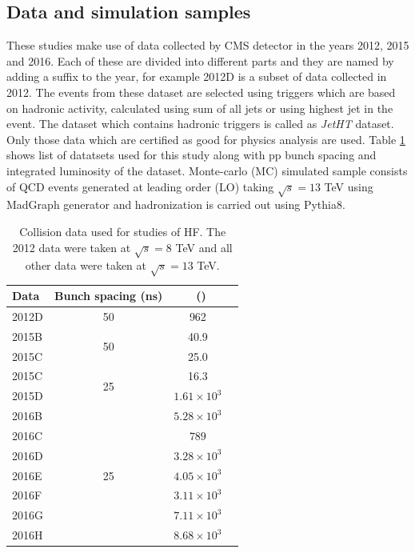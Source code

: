 \subsection{Data and simulation samples}\label{sec:dataset}
These studies make use of data collected by CMS detector in the years 2012, 2015 and 2016.
Each of these are divided into different parts and they are named by adding a suffix to the year,
for example 2012D is a subset of data collected in 2012. The events from these dataset are selected
using triggers which are based on hadronic activity, calculated using sum \pt of all jets or using 
highest \pt jet in the event. The dataset which contains hadronic triggers is called as \textit{JetHT} dataset. 
Only those data which are certified as good for physics analysis are used. 
Table \ref{tab:dataSamples} shows list of datatsets used for this study along with pp bunch spacing and integrated 
luminosity of the dataset.
Monte-carlo (MC) simulated sample consists of QCD events generated at
leading order (LO) taking $\sqrt{s}=13$ TeV using MadGraph generator and hadronization is carried out using Pythia8.

\begin{table}[!h]
\centering
\caption[Collision data used for \ratiosl studies of HF]{Collision data used for \ratiosl studies of HF. The 2012 data were taken at $\sqrt{s}=8$ TeV and all other data were taken at $\sqrt{s}=13$ TeV.}
\label{tab:dataSamples}
\begin{tabular}{lccc}
\hline
Data	&	Bunch spacing (ns) 	& \lumi \ (\pbinv)\\\hline\hline
2012D	&	50					&	962 \\\hline
2015B	&	\multirow{2}{*}{50}	&	40.9\\
2015C	&						&	25.0\\ \hline
2015C	&	\multirow{2}{*}{25}	&	16.3\\
2015D	&						&	$1.61\times 10^3$\\\hline
2016B	&	\multirow{7}{*}{25}	&	$5.28\times 10^3$\\
2016C	&						&	$789$\\
2016D	&						&	$3.28\times 10^3$\\
2016E	&						&	$4.05\times 10^3$\\
2016F	&						&	$3.11\times 10^3$\\
2016G	&						&	$7.11\times 10^3$\\
2016H	&						&	$8.68\times 10^3$\\\hline
\end{tabular}
\end{table}

